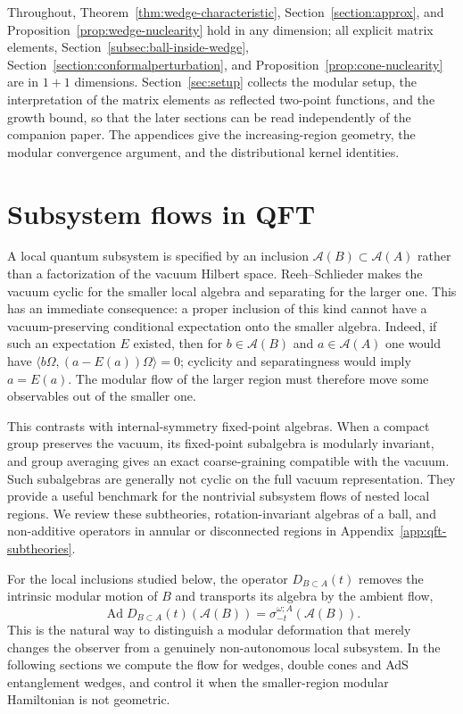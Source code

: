 \documentclass[a4paper,11pt]{article}
\theoremstyle{definition}
\begin{document}
Throughout, Theorem~\ref{thm:wedge-characteristic}, Section~\ref{section:approx}, and Proposition~\ref{prop:wedge-nuclearity} hold in any dimension; all explicit matrix elements, Section~\ref{subsec:ball-inside-wedge}, Section~\ref{section:conformalperturbation}, and Proposition~\ref{prop:cone-nuclearity} are in $1+1$ dimensions. Section~\ref{sec:setup} collects the modular setup, the interpretation of the matrix elements as reflected two-point functions, and the growth bound, so that the later sections can be read independently of the companion paper. The appendices give the increasing-region geometry, the modular convergence argument, and the distributional kernel identities.


\section{Subsystem flows in QFT}\label{sec:qft-subtheories}

A local quantum subsystem is specified by an inclusion $\mathcal A(B)\subset\mathcal A(A)$ rather than a factorization of the vacuum Hilbert space. Reeh--Schlieder makes the vacuum cyclic for the smaller local algebra and separating for the larger one. This has an immediate consequence: a proper inclusion of this kind cannot have a vacuum-preserving conditional expectation onto the smaller algebra. Indeed, if such an expectation $E$ existed, then for $b\in\mathcal A(B)$ and $a\in\mathcal A(A)$ one would have $\langle b\Omega,(a-E(a))\Omega\rangle=0$; cyclicity and separatingness would imply $a=E(a)$. The modular flow of the larger region must therefore move some observables out of the smaller one.

This contrasts with internal-symmetry fixed-point algebras. When a compact group preserves the vacuum, its fixed-point subalgebra is modularly invariant, and group averaging gives an exact coarse-graining compatible with the vacuum. Such subalgebras are generally not cyclic on the full vacuum representation. They provide a useful benchmark for the nontrivial subsystem flows of nested local regions. We review these subtheories, rotation-invariant algebras of a ball, and non-additive operators in annular or disconnected regions in Appendix~\ref{app:qft-subtheories}.

For the local inclusions studied below, the operator $D_{B\subset A}(t)$ removes the intrinsic modular motion of $B$ and transports its algebra by the ambient flow,
\begin{equation}
 \operatorname{Ad}D_{B\subset A}(t)(\mathcal A(B))
 =\sigma_{-t}^{\omega;A}(\mathcal A(B)).
 \label{eq:qft-main-transport}
\end{equation}
This is the natural way to distinguish a modular deformation that merely changes the observer from a genuinely non-autonomous local subsystem. In the following sections we compute the flow for wedges, double cones and AdS entanglement wedges, and control it when the smaller-region modular Hamiltonian is not geometric.
\end{document}
